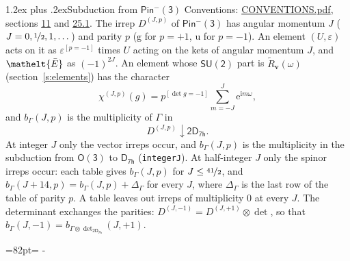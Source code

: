 \documentclass[10pt,a4paper]{article}
\makeatletter
\renewcommand\section{\@startsection{section}{1}{\z@}{-3ex plus -1ex minus -.2ex}%
  {1.2ex plus .2ex}{\normalfont\large\sffamily\bfseries\color{parttitle}}}
\newcommand{\needspace}[1]{\par\penalty-100\begingroup\dimen0=#1\relax\dimen2=\pagegoal
  \advance\dimen2-\pagetotal\ifdim\dimen0>\dimen2\relax\ifdim\dimen2>0pt\vfil\break\fi\fi
  \endgroup}
\numberwithin{equation}{section}
\newcommand{\eltfont}[1]{{\let\sigma\eltsigma\mathelt{#1}}}
\newcommand{\grp}[1]{\mathsf{#1}}
\newcommand{\elt}[1]{\eltfont{#1}}
\newcommand{\ptag}[1]{\mathrm{#1}}
\newcommand{\iverson}[1]{[#1]}
\newcommand{\restr}[2]{#1\!\downarrow#2}
\newcommand{\vv}{\mathbf{v}}
\newcommand{\iunit}{\mathrm{i}}
\newcommand{\expe}{\mathrm{e}}
\newcommand{\irrJp}[2]{D^{(#1,#2)}}
\newcommand{\irrprod}{\otimes}
\newcommand{\barred}[1]{\bar{#1}}
\newcommand{\lift}[1]{\tilde{#1}}
\makeatother
\begin{document}
\section{Subduction from \texorpdfstring{$\grp{Pin^{-}(3)}$}{Pin(3)}}\label{s:subduction_parent}
Conventions: \href{../../CONVENTIONS.pdf}{CONVENTIONS.pdf}, sections \href{../../../rotation/CONVENTIONS.pdf\#conv.11}{11} and \href{../../CONVENTIONS.pdf\#conv.25.1}{25.1}.
\leavevmode\label{n:index.J}\label{n:index.parity}\label{n:irrep.o3}The irrep $\irrJp{J}{p}$ of \href{Pinminus3.pdf}{$\grp{Pin^{-}(3)}$} has angular momentum $J$ ($J = 0, \nicefrac{1}{2}, 1, \dots$) and parity $p$ ($\ptag{g}$ for $p = +1$, $\ptag{u}$ for $p = -1$). An element $(U, \varepsilon)$ acts on it as $\varepsilon^{[p = -1]}$ times $U$ acting on the kets of angular momentum $J$, and $\elt{\barred{E}}$ as $(-1)^{2J}$. \label{n:function.character.parent}\label{n:function.multiplicity}An element whose $\grp{SU(2)}$ part is $\lift{R}_{\vv}(\omega)$ (section~\ref{s:elements}) has the character
\begin{equation}\label{e:chi}\chi^{(J,p)}(g) = p^{\iverson{\det g = -1}}\sum_{m=-J}^{J} \expe^{\iunit m\omega},\end{equation}
and $b_\Gamma(J, p)$ is the multiplicity of $\Gamma$ in
\begin{equation}\label{e:parent}\restr{\irrJp{J}{p}}{\grp{2D_{7h}}}.\end{equation}
At integer $J$ only the vector irreps occur, and $b_\Gamma(J, p)$ is the multiplicity in the subduction from $\grp{O(3)}$ to \href{../../../rotation/data/pdf/D7h.pdf}{$\grp{D_{7h}}$} (\texttt{integerJ}). \label{n:index.increment}At half-integer $J$ only the spinor irreps occur: each table gives $b_\Gamma(J, p)$ for $J \le \nicefrac{41}{2}$, and $b_\Gamma(J + 14, p) = b_\Gamma(J, p) + \Delta_\Gamma$ for every $J$, where $\Delta_\Gamma$ is the last row of the table of parity $p$. A table leaves out irreps of multiplicity 0 at every $J$.
\leavevmode\label{n:operator.determinant.character}The determinant exchanges the parities: $\irrJp{J}{-1} = \irrJp{J}{+1} \irrprod \det$, so that $b_\Gamma(J, -1) = b_{\Gamma \irrprod \det_{\grp{2D_{7h}}}}(J, +1)$.
\needspace{82pt}
\end{document}
